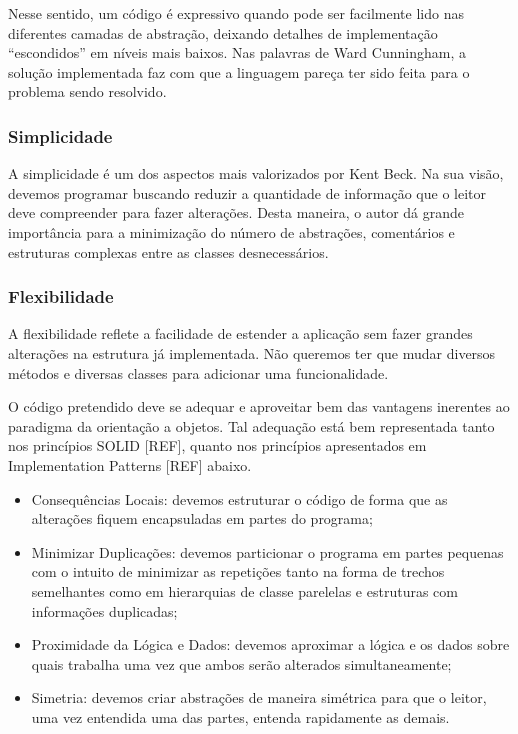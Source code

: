 Nesse sentido, um código é expressivo quando pode ser facilmente lido nas diferentes camadas de abstração, deixando detalhes de implementação ``escondidos'' em níveis mais baixos. Nas palavras de Ward Cunningham, a solução implementada faz com que a linguagem pareça ter sido feita para o problema sendo resolvido.

\subsubsection{Simplicidade}
A simplicidade é um dos aspectos mais valorizados por Kent Beck. Na sua visão, devemos programar buscando reduzir a quantidade de informação que o leitor deve compreender para fazer alterações. Desta maneira, o autor dá grande importância para a minimização do número de abstrações, comentários e estruturas complexas entre as classes desnecessários.

\subsubsection{Flexibilidade}
A flexibilidade reflete a facilidade de estender a aplicação sem fazer grandes alterações na estrutura já implementada. Não queremos ter que mudar diversos métodos e diversas classes para adicionar uma funcionalidade.

O código pretendido deve se adequar e aproveitar bem das vantagens inerentes ao paradigma da orientação a objetos. Tal adequação está bem representada tanto nos princípios SOLID [REF], quanto nos princípios apresentados em Implementation Patterns [REF] abaixo.

\begin{itemize}
	\item Consequências Locais: devemos estruturar o código de forma que as alterações fiquem encapsuladas em partes do programa;
	\item Minimizar Duplicações: devemos particionar o programa em partes pequenas com o intuito de minimizar as repetições tanto na forma de trechos semelhantes como em hierarquias de classe parelelas e estruturas com informações duplicadas;
	\item Proximidade da Lógica e Dados: devemos aproximar a lógica e os dados sobre quais trabalha uma vez que ambos serão alterados simultaneamente;
	\item Simetria: devemos criar abstrações de maneira simétrica para que o leitor, uma vez entendida uma das partes, entenda rapidamente as demais.
\end{itemize}


